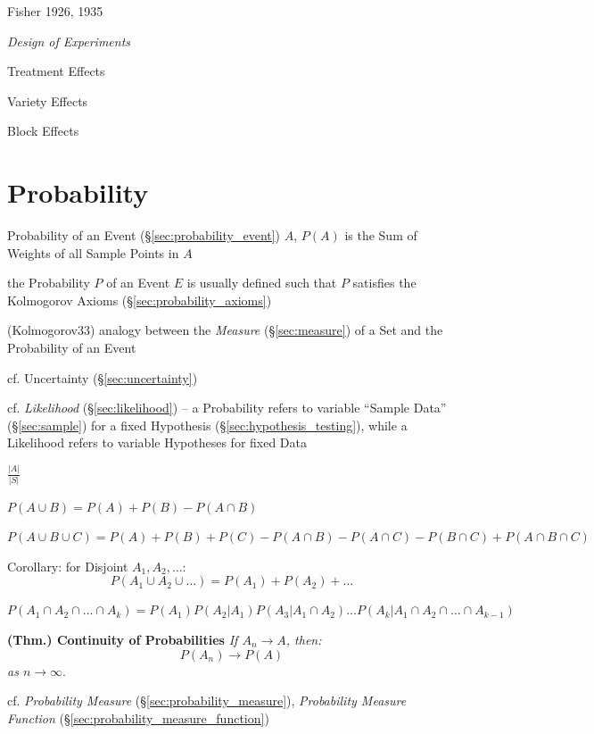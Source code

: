 
Fisher 1926, 1935

\emph{Design of Experiments}

Treatment Effects

Variety Effects

Block Effects



\section{Probability}\label{sec:probability}

Probability of an Event (\S\ref{sec:probability_event}) $A$, $P(A)$ is the Sum
of Weights of all Sample Points in $A$

the Probability $P$ of an Event $E$ is usually defined such that $P$ satisfies
the Kolmogorov Axioms (\S\ref{sec:probability_axioms})

(Kolmogorov33) analogy between the \emph{Measure} (\S\ref{sec:measure}) of a Set
and the Probability of an Event

cf. Uncertainty (\S\ref{sec:uncertainty})

cf. \emph{Likelihood} (\S\ref{sec:likelihood}) -- a Probability refers to
variable ``Sample Data'' (\S\ref{sec:sample}) for a fixed Hypothesis
(\S\ref{sec:hypothesis_testing}), while a Likelihood refers to variable
Hypotheses for fixed Data

$\frac{|A|}{|S|}$

$P(A \cup B) = P(A) + P(B) - P(A \cap B)$

$P(A \cup B \cup C) = P(A) + P(B) + P(C) - P(A \cap B) - P(A \cap C) -
P(B \cap C) + P(A \cap B \cap C)$

Corollary: for Disjoint $A_1, A_2, \ldots$:
\[
  P(A_1 \cup A_2 \cup \ldots) = P(A_1) + P(A_2) + \ldots
\]

$P(A_1 \cap A_2 \cap \ldots \cap A_k) = P(A_1) P(A_2 | A_1) P(A_3 |
A_1 \cap A_2) \ldots P(A_k | A_1 \cap A_2 \cap \ldots \cap A_{k-1})$

\textbf{(Thm.) Continuity of Probabilities} \emph{If $A_n \to A$, then:}
\[
  P(A_n) \to P(A)
\]
\emph{as $n \to \infty$}.

cf. \emph{Probability Measure} (\S\ref{sec:probability_measure}),
\emph{Probability Measure Function} (\S\ref{sec:probability_measure_function})

